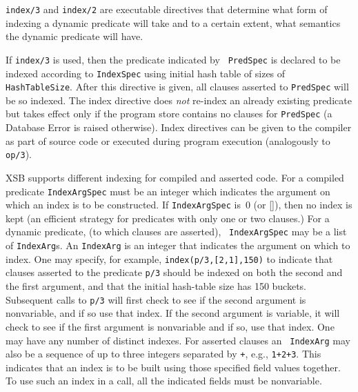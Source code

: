 \begin{description}
\vspace{-.35in}
\label{index_dynamic}
{\tt index/3} and {\tt index/2} are executable directives that
determine what form of indexing a dynamic predicate will take and to a
certain extent, what semantics the dynamic predicate will have.  

If {\tt index/3} is used, then the predicate indicated by {\tt
PredSpec} is declared to be indexed according to {\tt IndexSpec} using
initial hash table of sizes of {\tt HashTableSize}.  After this
directive is given, all clauses asserted to {\tt PredSpec} will be so
indexed.  The index directive does {\em not\/} re-index an already
existing predicate but takes effect only if the program store contains
no clauses for {\tt PredSpec} (a Database Error is raised
otherwise). Index directives can be given to the compiler as part of
source code or executed during program execution (analogously to {\tt
op/3}).

XSB supports different indexing for compiled and asserted code.  For a
compiled predicate {\tt IndexArgSpec} must be an integer which
indicates the argument on which an index is to be constructed.  If
{\tt IndexArgSpec} is~0 (or []), then no index is kept (an efficient
strategy for predicates with only one or two clauses.)  
For a dynamic predicate, (to which clauses are asserted), {\tt
IndexArgSpec} may be a list of {\tt IndexArg}s.  An {\tt IndexArg} is
an integer that indicates the argument on which to index.  One may
specify, for example, {\tt index(p/3,[2,1],150)} to indicate that
clauses asserted to the predicate {\tt p/3} should be indexed on both
the second and the first argument, and that the initial hash-table
size has 150 buckets.  Subsequent calls to {\tt p/3} will first check
to see if the second argument is nonvariable, and if so use that
index. If the second argument is variable, it will check to see if the
first argument is nonvariable and if so, use that index.  One may have
any number of distinct indexes.  For asserted clauses an {\tt
IndexArg} may also be a sequence of up to three integers separated by
{\tt +}, e.g., {\tt 1+2+3}.  This indicates that an index is to be
built using those specified field values together. To use such an
index in a call, all the indicated fields must be nonvariable.


\end{description}
